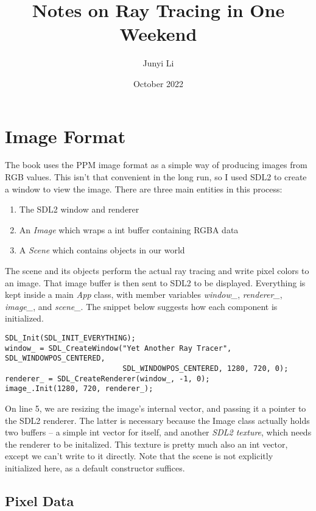 \documentclass{scrartcl}
\title{Notes on Ray Tracing in One Weekend}
\author{Junyi Li}
\date{October 2022}
\begin{document}
\maketitle

\section{Image Format}

The book uses the PPM image format as a simple way of producing images from RGB values.
This isn't that convenient in the long run, so I used SDL2 to create a window to view the image.
There are three main entities in this process:

\begin{enumerate}

\item The SDL2 window and renderer
\item An \emph{Image} which wraps a int buffer containing RGBA data
\item A \emph{Scene} which contains objects in our world

\end{enumerate}

The scene and its objects perform the actual ray tracing and write pixel colors to an image.
That image buffer is then sent to SDL2 to be displayed.
Everything is kept inside a main \emph{App} class, with member variables \emph{window\_}, \emph{renderer\_}, \emph{image\_}, and \emph{scene\_}.
The snippet below suggests how each component is initialized.

\begin{verbatim}
SDL_Init(SDL_INIT_EVERYTHING);
window_ = SDL_CreateWindow("Yet Another Ray Tracer", SDL_WINDOWPOS_CENTERED, 
                           SDL_WINDOWPOS_CENTERED, 1280, 720, 0);
renderer_ = SDL_CreateRenderer(window_, -1, 0);
image_.Init(1280, 720, renderer_);
\end{verbatim}

On line 5, we are resizing the image's internal vector, and passing it a pointer to the SDL2 renderer.
The latter is necessary because the Image class actually holds two buffers -- a simple int vector for itself, and another \emph{SDL2 texture}, which needs the renderer to be initalized.
This texture is pretty much also an int vector, except we can't write to it directly.
Note that the scene is not explicitly initialized here, as a default constructor suffices.

\subsection{Pixel Data}
\end{document}
